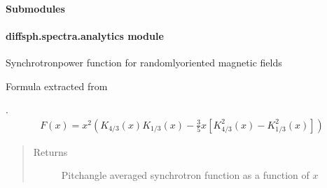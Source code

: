 \documentclass[letterpaper,10pt,english]{sphinxmanual}
\begin{document}
\paragraph{Submodules}
\label{\detokenize{diffsph.spectra:submodules}}

\paragraph{diffsph.spectra.analytics module}
\label{\detokenize{diffsph.spectra:module-diffsph.spectra.analytics}}\label{\detokenize{diffsph.spectra:diffsph-spectra-analytics-module}}

\begin{fulllineitems}
\label{\detokenize{diffsph.spectra:diffsph.spectra.analytics.Fav}}
\sphinxAtStartPar
Synchrotron\sphinxhyphen{}power function for randomly\sphinxhyphen{}oriented magnetic fields %
\begin{footnote}[*]\sphinxAtStartFootnote
Formula extracted from 
%
\end{footnote}.
\begin{equation*}
\begin{split}F(x) = x^2 \left(K_{4/3}(x) K_{1/3}(x) - \frac35 x [K_{4/3}^2(x) - K_{1/3}^2(x)]\right)\end{split}
\end{equation*}\begin{quote}\begin{description}
\item[{Returns}] \leavevmode
\sphinxAtStartPar
Pitch\sphinxhyphen{}angle averaged synchrotron function as a function of \(x\)

\end{description}\end{quote}

\end{fulllineitems}

\end{document}
